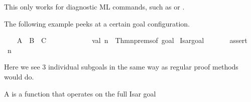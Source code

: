 \begin{isabellebody}
\begin{isamarkuptext}
\begin{description}
  This only works for diagnostic ML commands, such as \hyperlink{command.ML-val}{\mbox{}} or \hyperlink{command.ML-command}{\mbox{}}.

  \end{description}%
\end{isamarkuptext}%
\isamarkuptrue%
%
\endisatagmlantiq
{\isafoldmlantiq}%
%
\isadelimmlantiq
%
\endisadelimmlantiq
%
\isadelimmlex
%
\endisadelimmlex
%
\isatagmlex
%
\begin{isamarkuptext}%
The following example peeks at a certain goal configuration.%
\end{isamarkuptext}%
\isamarkuptrue%
%
\endisatagmlex
{\isafoldmlex}%
%
\isadelimmlex
%
\endisadelimmlex
{}\isamarkupfalse%
\isanewline
%
\isadelimproof
\ \ %
\endisadelimproof
%
\isatagproof
{}\isamarkupfalse%
\ A\ \ B\ \ C%
\endisatagproof
{\isafoldproof}%
%
\isadelimproof
\isanewline
%
\endisadelimproof
%
\isadelimML
\ \ \ \ %
\endisadelimML
%
\isatagML
{}\isamarkupfalse%
\ {}\isanewline
\ \ \ \ \ \ val\ n\ {}\ Thm{}nprems{}of\ {}{}goal\ %
\isaantiq
Isar{}goal{}%
\endisaantiq
{}{}\isanewline
\ \ \ \ \ \ %
\isaantiq
assert{}%
\endisaantiq
\ {}n\ {}\ {}{}{}\isanewline
\ \ \ \ {}%
\endisatagML
{\isafoldML}%
%
\isadelimML
\isanewline
%
\endisadelimML
%
\isadelimproof
\ \ \ \ %
\endisadelimproof
%
\isatagproof
{}\isamarkupfalse%
%
\endisatagproof
{\isafoldproof}%
%
\isadelimproof
%
\endisadelimproof
%
\begin{isamarkuptext}%
Here we see 3 individual subgoals in the same way as regular
  proof methods would do.%
\end{isamarkuptext}%
\isamarkuptrue%
%
\isamarkuptrue%
%
\begin{isamarkuptext}%
A  is a function  that operates on the full Isar goal

\end{isamarkuptext}
\end{isabellebody}
